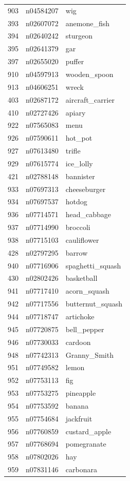 \begin{table}
\begin{tabular}{cll}
903 & n04584207 & wig \\
393 & n02607072 & anemone_fish \\
394 & n02640242 & sturgeon \\
395 & n02641379 & gar \\
397 & n02655020 & puffer \\
910 & n04597913 & wooden_spoon \\
913 & n04606251 & wreck \\
403 & n02687172 & aircraft_carrier \\
410 & n02727426 & apiary \\
922 & n07565083 & menu \\
926 & n07590611 & hot_pot \\
927 & n07613480 & trifle \\
929 & n07615774 & ice_lolly \\
421 & n02788148 & bannister \\
933 & n07697313 & cheeseburger \\
934 & n07697537 & hotdog \\
936 & n07714571 & head_cabbage \\
937 & n07714990 & broccoli \\
938 & n07715103 & cauliflower \\
428 & n02797295 & barrow \\
940 & n07716906 & spaghetti_squash \\
430 & n02802426 & basketball \\
941 & n07717410 & acorn_squash \\
942 & n07717556 & butternut_squash \\
944 & n07718747 & artichoke \\
945 & n07720875 & bell_pepper \\
946 & n07730033 & cardoon \\
948 & n07742313 & Granny_Smith \\
951 & n07749582 & lemon \\
952 & n07753113 & fig \\
953 & n07753275 & pineapple \\
954 & n07753592 & banana \\
955 & n07754684 & jackfruit \\
956 & n07760859 & custard_apple \\
957 & n07768694 & pomegranate \\
958 & n07802026 & hay \\
959 & n07831146 & carbonara \\

\end{tabular}
\end{table}
